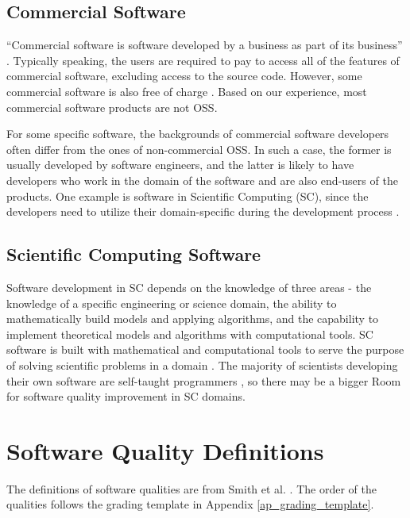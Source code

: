 \subsection{Commercial Software}
``Commercial software is software developed by a business as part of its business'' \cite{GNU2019}.
Typically speaking, the users are required to pay to access all of the features of commercial software, excluding access to the source code. However, some commercial software is also free of charge \cite{GNU2019}. Based on our experience, most commercial software products are not OSS.

For some specific software, the backgrounds of commercial software developers often differ from the ones of non-commercial OSS. In such a case, the former is usually developed by software engineers, and the latter is likely to have developers who work in the domain of the software and are also end-users of the products. One example is software in Scientific Computing (SC), since the developers need to utilize their domain-specific during the development process \cite{WilsonEtAl2014}.

\subsection{Scientific Computing Software}
Software development in SC depends on the knowledge of three areas - the knowledge of a specific engineering or science domain, the ability to mathematically build models and applying algorithms, and the capability to implement theoretical models and algorithms with computational tools. SC software is built with mathematical and computational tools to serve the purpose of solving scientific problems in a domain \cite{Mehta2015}. The majority of scientists developing their own software are self-taught programmers \cite{WilsonEtAl2014}, so there may be a bigger Room for software quality improvement in SC domains.

\section{Software Quality Definitions}
\label{sec_software_quality}

The definitions of software qualities are from Smith et al. \cite{SmithEtAl2020}. The order of the qualities follows the grading template in Appendix \ref{ap_grading_template}.

